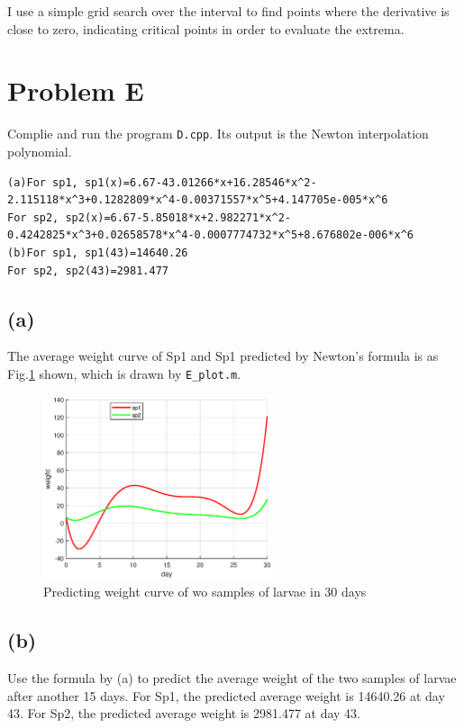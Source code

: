 \documentclass[a4paper]{article}
\begin{document}
I use a simple grid search over the interval to find 
points where the derivative is close to zero, indicating critical points in order to evaluate the extrema.


\section*{Problem E}
Complie and run the program \verb|D.cpp|. Its output is the Newton interpolation polynomial.
\begin{lstlisting}[breaklines=true]
(a)For sp1, sp1(x)=6.67-43.01266*x+16.28546*x^2-2.115118*x^3+0.1282809*x^4-0.00371557*x^5+4.147705e-005*x^6
For sp2, sp2(x)=6.67-5.85018*x+2.982271*x^2-0.4242825*x^3+0.02658578*x^4-0.0007774732*x^5+8.676802e-006*x^6
(b)For sp1, sp1(43)=14640.26
For sp2, sp2(43)=2981.477
\end{lstlisting}
\subsection*{(a)}
The average weight curve of Sp1 and Sp1 predicted by Newton's formula is as Fig.\ref{fig3} shown, which is drawn by \verb|E_plot.m|.
\begin{figure}[htbp]
  \centering
  \includegraphics[width=0.6\textwidth]{images/E_pic.eps}  
  \renewcommand{\figurename}{Fig.}
  \caption{Predicting weight curve of wo samples of larvae in 30 days}
  \label{fig3}
\end{figure}

\subsection*{(b)}
Use the formula by (a) to predict the average weight of the two samples of larvae after another 15 days. 
For Sp1, the predicted average weight is 14640.26 at day 43. For Sp2, the predicted average weight is 2981.477 at day 43.
\end{document}
